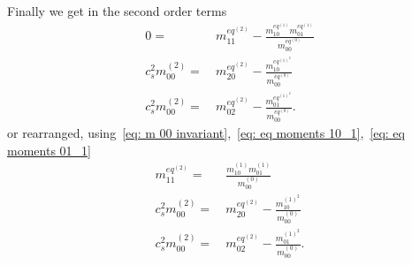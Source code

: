 Finally we get in the second order terms
\begin{align}
    \label{eq: eq moments 11_2}
    0 =&\ m_{11}^{eq^{(2)}} - \frac{ m_{10}^{eq^{(1)}}m_{01}^{eq^{(1)}}}{m_{00}^{eq^{(0)}}}
    \\
    \label{eq: eq moments 20_2}
    c_s^2 m_{00}^{(2)} =&\ m_{20}^{eq^{(2)}} - \frac{ m_{10}^{eq^{{(1)}^2}}}{m_{00}^{eq^{(0)}}}
    \\
    \label{eq: eq moments 02_2}
    c_s^2 m_{00}^{(2)} =&\ m_{02}^{eq^{(2)}} - \frac{ m_{01}^{eq^{{(1)}^2}}}{m_{00}^{eq^{(0)}}} .
\end{align}
or rearranged, using~\eqref{eq: m 00 invariant},~\eqref{eq: eq moments 10_1},~\eqref{eq: eq moments 01_1}
\begin{align}
    m_{11}^{eq^{(2)}} =&\  \frac{ m_{10}^{(1)}m_{01}^{(1)}}{m_{00}^{(0)}}
    \label{eq: eq moments 11_2 rearrange}
    \\
    c_s^2 m_{00}^{(2)} =&\ m_{20}^{eq^{(2)}} - \frac{ m_{10}^{{(1)}^2}}{m_{00}^{(0)}}
    \label{eq: eq moments 20_2 rearrange}
    \\
    \label{eq: eq moments 02_2 rearrange}
    c_s^2 m_{00}^{(2)} =&\ m_{02}^{eq^{(2)}} - \frac{ m_{01}^{{(1)}^2}}{m_{00}^{(0)}} .
\end{align}
